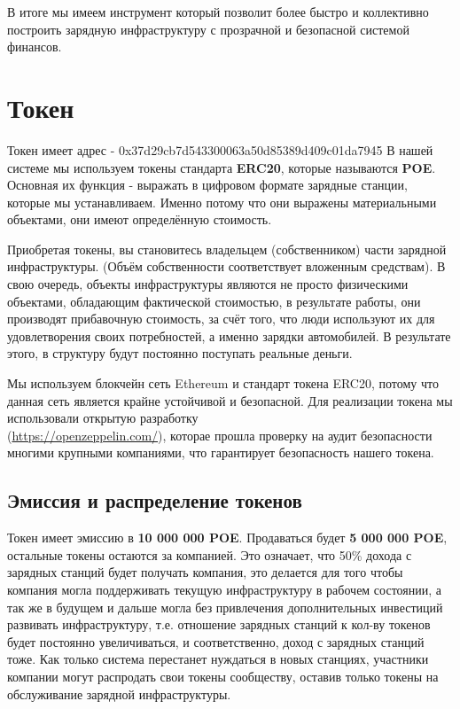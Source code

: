\documentclass[a4paper,12pt]{report}
\newcommand{\contractAddress}{0x37d29cb7d543300063a50d85389d409c01da7945}
\begin{document}
В итоге мы имеем инструмент который позволит более быстро и коллективно построить зарядную инфраструктуру с прозрачной и безопасной системой финансов.

\section{Токен}

Токен имеет адрес - \contractAddress
В нашей системе мы используем токены стандарта \textbf{ERC20}, которые называются \textbf{POE}. Основная их функция - выражать в цифровом формате зарядные станции, которые мы устанавливаем. Именно потому что они выражены материальными объектами, они имеют
определённую стоимость.

Приобретая токены, вы становитесь владельцем (собственником) части зарядной инфраструктуры. (Объём собственности соответствует вложенным средствам). В свою очередь, объекты инфраструктуры являются не просто физическими объектами, обладающим фактической стоимостью, в результате работы, они производят прибавочную стоимость, за счёт того, что люди используют их для удовлетворения своих потребностей, а именно зарядки автомобилей. В результате этого, в структуру будут постоянно поступать реальные деньги.

Мы используем блокчейн сеть Ethereum и стандарт токена ERC20, потому что данная сеть является крайне устойчивой и безопасной.
Для реализации токена мы использовали открытую разработку \\ (\href{https://openzeppelin.com/}{https://openzeppelin.com/}), которае прошла проверку на аудит безопасности многими крупными компаниями, что гарантирует безопасность нашего токена.


\subsection{Эмиссия и распределение токенов}

Токен имеет эмиссию в \textbf{10 000 000 POE}. Продаваться будет\textbf{ 5 000 000 POE}, остальные токены остаются за компанией. Это означает, что 50\% дохода с зарядных станций будет получать компания, это делается для того чтобы компания могла поддерживать текущую инфраструктуру в рабочем состоянии, а так же в будущем и дальше могла без привлечения дополнительных инвестиций развивать инфраструктуру, т.е. отношение зарядных станций к кол-ву токенов будет постоянно увеличиваться, и соответственно, доход с зарядных станций тоже. Как только система перестанет нуждаться в новых станциях, участники компании могут распродать свои токены сообществу, оставив только токены на обслуживание зарядной инфраструктуры.
\end{document}
